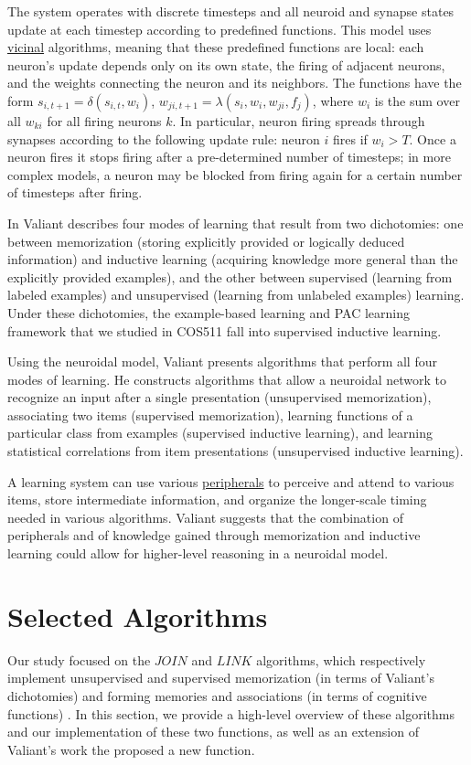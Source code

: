 \documentclass[letterpaper, 12pt]{article}
\begin{document}
The system operates with discrete timesteps and all neuroid and synapse states update at each timestep according to predefined functions. This model uses \underline{vicinal} algorithms, meaning that these predefined functions are local: each neuron's update depends only on its own state, the firing of adjacent neurons, and the weights connecting the neuron and its neighbors. The functions have the form $s_{i,t+1}=\delta(s_{i,t},w_i)$, $w_{ji,t+1}=\lambda(s_i,w_i,w_{ji},f_j)$, where $w_i$ is the sum over all $w_{ki}$ for all firing neurons $k$. In particular, neuron firing spreads through synapses according to the following update rule: neuron $i$ fires if $w_i>T$. Once a neuron fires it stops firing after a pre-determined number of timesteps; in more complex models, a neuron may be blocked from firing again for a certain number of timesteps after firing.

In \cite{valiant_circuits_1994} Valiant describes four modes of learning that result from two dichotomies: one between memorization (storing explicitly provided or logically deduced information) and inductive learning (acquiring knowledge more general than the explicitly provided examples), and the other between supervised (learning from labeled examples) and unsupervised (learning from unlabeled examples) learning. Under these dichotomies, the example-based learning and PAC learning framework that we studied in COS511 fall into supervised inductive learning.

Using the neuroidal model, Valiant presents algorithms that perform all four modes of learning. He constructs algorithms that allow a neuroidal network to recognize an input after a single presentation (unsupervised memorization), associating two items (supervised memorization), learning functions of a particular class from examples (supervised inductive learning), and learning statistical correlations from item presentations (unsupervised inductive learning).

A learning system can use various \underline{peripherals} to perceive and attend to various items, store intermediate information, and organize the longer-scale timing needed in various algorithms. Valiant suggests that the combination of peripherals and of knowledge gained through memorization and inductive learning could allow for higher-level reasoning in a neuroidal model.

\section{Selected Algorithms}\label{sec:selected_algorithms}
Our study focused on the $JOIN$ and $LINK$ algorithms, which respectively implement unsupervised and supervised memorization (in terms of Valiant's dichotomies) and forming memories and associations (in terms of cognitive functions) \cite{valiant_circuits_1994, papadimitriou_cortical_2015}. In this section, we provide a high-level overview of these algorithms and our implementation of these two functions, as well as an extension of Valiant's work the proposed a new function.
\end{document}
